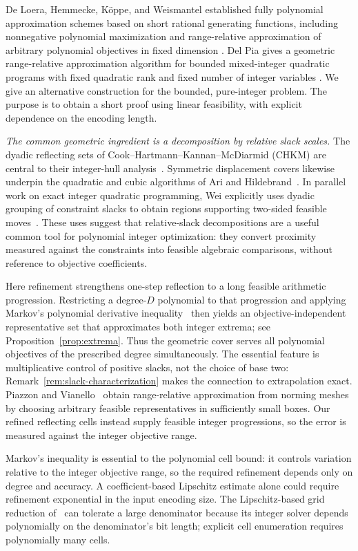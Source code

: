 \documentclass[11pt]{article}
\theoremstyle{definition}\newtheorem{definition}{Definition}[section]
\theoremstyle{remark}\newtheorem{remark}[theorem]{Remark}
\begin{document}
De Loera, Hemmecke, K\"oppe, and Weismantel established fully polynomial approximation schemes based on short rational generating functions, including nonnegative polynomial maximization and range-relative approximation of arbitrary polynomial objectives in fixed dimension \cite{DHKW06,DHKW08}. Del Pia gives a geometric range-relative approximation algorithm for bounded mixed-integer quadratic programs with fixed quadratic rank and fixed number of integer variables \cite{DelPia}. We give an alternative construction for the bounded, pure-integer problem. The purpose is to obtain a short proof using linear feasibility, with explicit dependence on the encoding length.

\emph{The common geometric ingredient is a decomposition by relative slack scales.} The dyadic reflecting sets of Cook--Hartmann--Kannan--McDiarmid (CHKM) are central to their integer-hull analysis~\cite{CHKM}. Symmetric displacement covers likewise underpin the quadratic and cubic algorithms of Ari and Hildebrand~\cite{AH}. In parallel work on exact integer quadratic programming, Wei explicitly uses dyadic grouping of constraint slacks to obtain regions supporting two-sided feasible moves~\cite[Section~1.1]{Wei}. These uses suggest that relative-slack decompositions are a useful common tool for polynomial integer optimization: they convert proximity measured against the constraints into feasible algebraic comparisons, without reference to objective coefficients.

Here refinement strengthens one-step reflection to a long feasible arithmetic progression. Restricting a degree-$D$ polynomial to that progression and applying Markov's polynomial derivative inequality~\cite[Theorem~5.1.8]{BorweinErdelyi} then yields an objective-independent representative set that approximates both integer extrema; see Proposition~\ref{prop:extrema}. Thus the geometric cover serves all polynomial objectives of the prescribed degree simultaneously. The essential feature is multiplicative control of positive slacks, not the choice of base two: Remark~\ref{rem:slack-characterization} makes the connection to extrapolation exact. Piazzon and Vianello~\cite[Propositions~1--2]{PV} obtain range-relative approximation from norming meshes by choosing arbitrary feasible representatives in sufficiently small boxes. Our refined reflecting cells instead supply feasible integer progressions, so the error is measured against the integer objective range.

Markov's inequality is essential to the polynomial cell bound: it controls variation relative to the integer objective range, so the required refinement depends only on degree and accuracy. A coefficient-based Lipschitz estimate alone could require refinement exponential in the input encoding size. The Lipschitz-based grid reduction of~\cite{DHKW08} can tolerate a large denominator because its integer solver depends polynomially on the denominator's bit length; explicit cell enumeration requires polynomially many cells.
\end{document}

